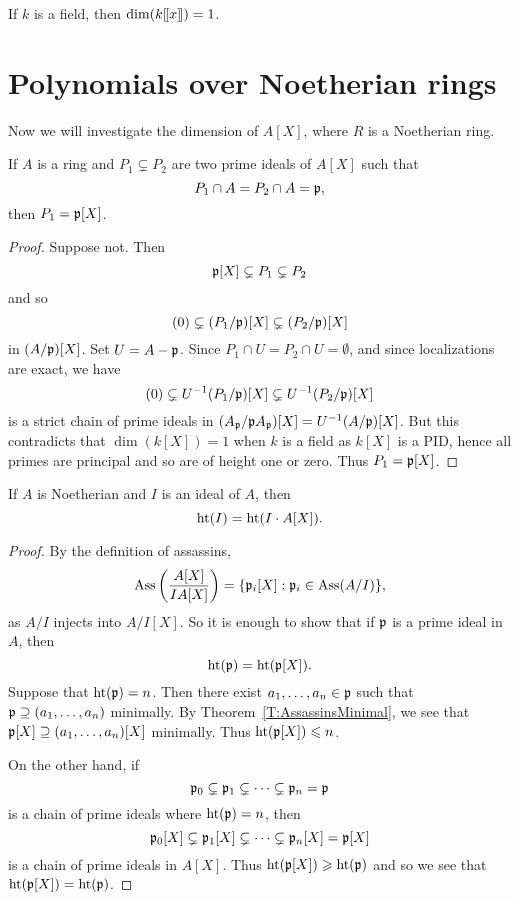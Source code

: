 \documentclass{ximera}
\begin{document}
\begin{example}
  If $k$ is a field, then $\dim(k[\hspace{-0.25ex}[ x ]\hspace{-0.25ex}]) = 1$.
\end{example}


\section{Polynomials over Noetherian rings}

Now we will investigate the dimension of $A[X]$, where $R$ is a
Noetherian ring.


\begin{lemma}\label{L:FT1} If $A$ is a ring and $P_1\subsetneq P_2$ are two prime ideals of $A[X]$ such that
\[
P_1\cap A = P_2\cap A = \mathfrak{p},
\]
then $P_1 = \mathfrak{p}[X]$.
\end{lemma}

\begin{proof} Suppose not. Then 
\[
\mathfrak{p}[X]\subsetneq P_1\subsetneq P_2 
\]
and so 
\[
(0) \subsetneq (P_1/\mathfrak{p})[X] \subsetneq (P_2/\mathfrak{p})[X]
\]
in $(A/\mathfrak{p}) [X]$. Set $U = A-\mathfrak{p}$.  Since $P_1 \cap U = P_2 \cap U = \emptyset$, and since localizations are exact, we have
\[
(0) \subsetneq U^{-1}(P_1/\mathfrak{p})[X] \subsetneq U^{-1}(P_2/\mathfrak{p})[X]
\]
is a strict chain of prime ideals in $(A_{\mathfrak{p}}/\mathfrak{p} A_{\mathfrak{p}})[X] = U^{-1}(A/\mathfrak{p})[X]$.  But this contradicts that $\dim(k[X]) = 1$ when $k$ is a field as $k[X]$ is a PID, hence all primes are principal and so are of height one or zero.  Thus $P_1 = \mathfrak{p}[X]$.
\end{proof}


\begin{lemma}\label{L:FT2}
  If $A$ is Noetherian and $I$ is an ideal of $A$, then
  \[
  \operatorname{ht}(I) = \operatorname{ht}(I\cdot A[X]).
  \]
  \begin{proof}
    By the definition of assassins,
    \[
    \operatorname{Ass}\left(\frac{A[X]}{IA[X]}\right) = \{\mathfrak{p}_i[X]: \mathfrak{p}_i\in\operatorname{Ass}(A/I)\},
    \]
    as $A/I$ injects into $A/I [X]$. So it is enough to show that if $\mathfrak{p}$ is a prime ideal in $A$, then 
    \[
    \operatorname{ht}(\mathfrak{p}) = \operatorname{ht}(\mathfrak{p}[X]).
    \]
    Suppose that $\operatorname{ht}(\mathfrak{p}) = n$. Then there exist $a_1,\dots,a_n\in \mathfrak{p}$
    such that $\mathfrak{p}\supseteq(a_1,\dots,a_n)$ minimally. By
    Theorem~\ref{T:AssassinsMinimal}, we see that
    $\mathfrak{p}[X]\supseteq(a_1,\dots,a_n)[X]$ minimally. Thus $\operatorname{ht}(\mathfrak{p}[X])\leqslant n$.
    
    On the other hand, if 
    \[
    \mathfrak{p}_0 \subsetneq \mathfrak{p}_1 \subsetneq \cdots \subsetneq \mathfrak{p}_n = \mathfrak{p}
    \] 
    is a chain of prime ideals where $\operatorname{ht}(\mathfrak{p}) = n$, then 
    \[
    \mathfrak{p}_0[X] \subsetneq \mathfrak{p}_1[X] \subsetneq \cdots \subsetneq \mathfrak{p}_n[X] = \mathfrak{p}[X]
    \]
    is a chain of prime ideals in $A[X]$. Thus $\operatorname{ht}(\mathfrak{p}[X])\geqslant \operatorname{ht}(\mathfrak{p})$
    and so we see that $\operatorname{ht}(\mathfrak{p}[X]) = \operatorname{ht}(\mathfrak{p})$.
\end{proof}
\end{lemma}
\end{document}
